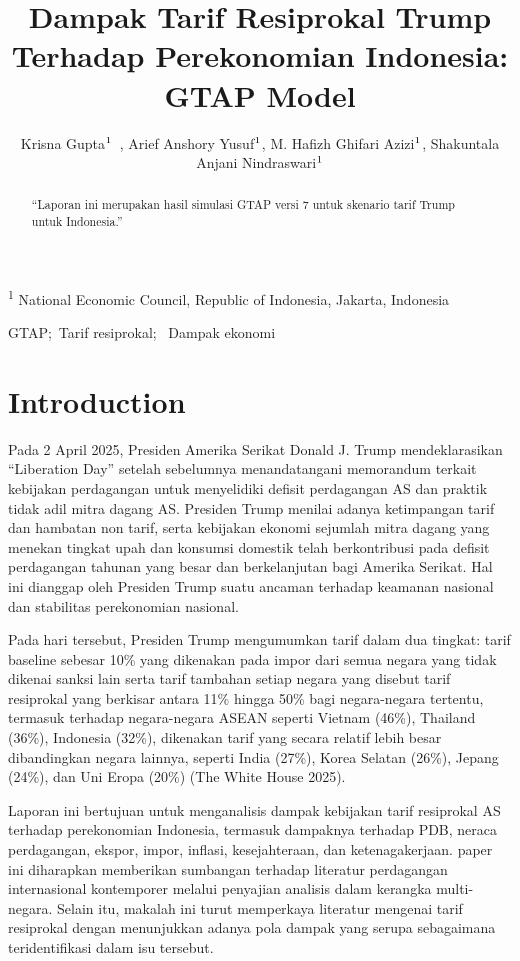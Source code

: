 \documentclass[
]{interact}
\title{Dampak Tarif Resiprokal Trump Terhadap Perekonomian Indonesia:
GTAP Model}
\author{Krisna
Gupta$\textsuperscript{1}$~\orcidlink{0000-0001-8695-0514}, Arief
Anshory Yusuf$\textsuperscript{1}$, M. Hafizh Ghifari
Azizi$\textsuperscript{1}$, Shakuntala Anjani
Nindraswari$\textsuperscript{1}$}
\begin{document}
\captionsetup{labelsep=space}
\maketitle
\textsuperscript{1}  National Economic Council, Republic of
Indonesia, Jakarta, Indonesia
\begin{abstract}
``Laporan ini merupakan hasil simulasi GTAP versi 7 untuk skenario tarif
Trump untuk Indonesia.''
\end{abstract}
\begin{keywords}
\def\sep{;\ }
GTAP\sep Tarif resiprokal\sep 
Dampak ekonomi
\end{keywords}


\section{Introduction}\label{introduction}

Pada 2 April 2025, Presiden Amerika Serikat Donald J. Trump
mendeklarasikan ``Liberation Day'' setelah sebelumnya menandatangani
memorandum terkait kebijakan perdagangan untuk menyelidiki defisit
perdagangan AS dan praktik tidak adil mitra dagang AS. Presiden Trump
menilai adanya ketimpangan tarif dan hambatan non tarif, serta kebijakan
ekonomi sejumlah mitra dagang yang menekan tingkat upah dan konsumsi
domestik telah berkontribusi pada defisit perdagangan tahunan yang besar
dan berkelanjutan bagi Amerika Serikat. Hal ini dianggap oleh Presiden
Trump suatu ancaman terhadap keamanan nasional dan stabilitas
perekonomian nasional.

Pada hari tersebut, Presiden Trump mengumumkan tarif dalam dua tingkat:
tarif baseline sebesar 10\% yang dikenakan pada impor dari semua negara
yang tidak dikenai sanksi lain serta tarif tambahan setiap negara yang
disebut tarif resiprokal yang berkisar antara 11\% hingga 50\% bagi
negara-negara tertentu, termasuk terhadap negara-negara ASEAN seperti
Vietnam (46\%), Thailand (36\%), Indonesia (32\%), dikenakan tarif yang
secara relatif lebih besar dibandingkan negara lainnya, seperti India
(27\%), Korea Selatan (26\%), Jepang (24\%), dan Uni Eropa (20\%) (The
White House 2025).

Laporan ini bertujuan untuk menganalisis dampak kebijakan tarif
resiprokal AS terhadap perekonomian Indonesia, termasuk dampaknya
terhadap PDB, neraca perdagangan, ekspor, impor, inflasi, kesejahteraan,
dan ketenagakerjaan. paper ini diharapkan memberikan sumbangan terhadap
literatur perdagangan internasional kontemporer melalui penyajian
analisis dalam kerangka multi-negara. Selain itu, makalah ini turut
memperkaya literatur mengenai tarif resiprokal dengan menunjukkan adanya
pola dampak yang serupa sebagaimana teridentifikasi dalam isu tersebut.
\end{document}
